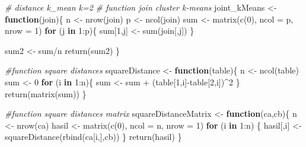 \documentclass[
]{article}
\newenvironment{Shaded}{\begin{snugshade}}{\end{snugshade}}
\newcommand{\AttributeTok}[1]{\textcolor[rgb]{0.77,0.63,0.00}{#1}}
\newcommand{\CommentTok}[1]{\textcolor[rgb]{0.56,0.35,0.01}{\textit{#1}}}
\newcommand{\ControlFlowTok}[1]{\textcolor[rgb]{0.13,0.29,0.53}{\textbf{#1}}}
\newcommand{\DecValTok}[1]{\textcolor[rgb]{0.00,0.00,0.81}{#1}}
\newcommand{\FunctionTok}[1]{\textcolor[rgb]{0.00,0.00,0.00}{#1}}
\newcommand{\NormalTok}[1]{#1}
\newcommand{\OtherTok}[1]{\textcolor[rgb]{0.56,0.35,0.01}{#1}}
\newcommand{\SpecialCharTok}[1]{\textcolor[rgb]{0.00,0.00,0.00}{#1}}
\begin{document}
\begin{Shaded}
\begin{Highlighting}[]
\CommentTok{\# distance k\_mean k=2}
\CommentTok{\# function join cluster k{-}means}
\NormalTok{joint\_kMeans }\OtherTok{\textless{}{-}} \ControlFlowTok{function}\NormalTok{(join)\{}
\NormalTok{    n }\OtherTok{\textless{}{-}} \FunctionTok{nrow}\NormalTok{(join)}
\NormalTok{    p }\OtherTok{\textless{}{-}} \FunctionTok{ncol}\NormalTok{(join)}
\NormalTok{    sum }\OtherTok{\textless{}{-}} \FunctionTok{matrix}\NormalTok{(}\FunctionTok{c}\NormalTok{(}\DecValTok{0}\NormalTok{), }\AttributeTok{ncol =}\NormalTok{ p, }\AttributeTok{nrow =} \DecValTok{1}\NormalTok{)}
    \ControlFlowTok{for}\NormalTok{ (j }\ControlFlowTok{in} \DecValTok{1}\SpecialCharTok{:}\NormalTok{p)\{}
\NormalTok{      sum[}\DecValTok{1}\NormalTok{,j] }\OtherTok{\textless{}{-}} \FunctionTok{sum}\NormalTok{(join[,j])  }
\NormalTok{    \}}
    
\NormalTok{    sum2 }\OtherTok{\textless{}{-}}\NormalTok{ sum}\SpecialCharTok{/}\NormalTok{n}
    \FunctionTok{return}\NormalTok{(sum2)}
\NormalTok{\}}

\CommentTok{\#function square distances}
\NormalTok{squareDistance }\OtherTok{\textless{}{-}} \ControlFlowTok{function}\NormalTok{(table)\{}
\NormalTok{  n }\OtherTok{\textless{}{-}} \FunctionTok{ncol}\NormalTok{(table)}
\NormalTok{  sum }\OtherTok{\textless{}{-}} \DecValTok{0}
  \ControlFlowTok{for}\NormalTok{ (i }\ControlFlowTok{in} \DecValTok{1}\SpecialCharTok{:}\NormalTok{n)\{}
\NormalTok{    sum }\OtherTok{\textless{}{-}}\NormalTok{ sum }\SpecialCharTok{+}\NormalTok{ (table[}\DecValTok{1}\NormalTok{,i]}\SpecialCharTok{{-}}\NormalTok{table[}\DecValTok{2}\NormalTok{,i])}\SpecialCharTok{\^{}}\DecValTok{2}
\NormalTok{  \}}
  \FunctionTok{return}\NormalTok{(}\FunctionTok{matrix}\NormalTok{(sum))}
\NormalTok{\}}

\CommentTok{\#function square distances matrix}
\NormalTok{squareDistanceMatrix }\OtherTok{\textless{}{-}} \ControlFlowTok{function}\NormalTok{(ca,cb)\{}
\NormalTok{  n }\OtherTok{\textless{}{-}} \FunctionTok{nrow}\NormalTok{(ca)}
\NormalTok{  hasil }\OtherTok{\textless{}{-}} \FunctionTok{matrix}\NormalTok{(}\FunctionTok{c}\NormalTok{(}\DecValTok{0}\NormalTok{), }\AttributeTok{ncol =}\NormalTok{ n, }\AttributeTok{nrow =} \DecValTok{1}\NormalTok{)}
  \ControlFlowTok{for}\NormalTok{ (i }\ControlFlowTok{in} \DecValTok{1}\SpecialCharTok{:}\NormalTok{n) \{}
\NormalTok{    hasil[,i] }\OtherTok{\textless{}{-}} \FunctionTok{squareDistance}\NormalTok{(}\FunctionTok{rbind}\NormalTok{(ca[i,],cb))}
\NormalTok{  \}}
  \FunctionTok{return}\NormalTok{(hasil)}
\NormalTok{\}}
\end{Highlighting}
\end{Shaded}
\end{document}
